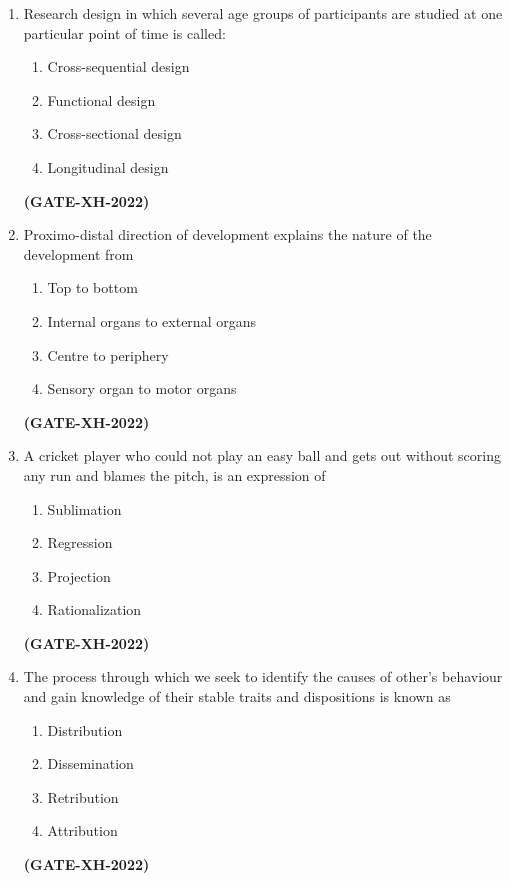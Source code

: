 \documentclass[journal]{IEEEtran}
\begin{document}
\begin{enumerate}
\item Research design in which several age groups of participants are studied at one particular point of time is called:
\begin{multicols}{2}
\begin{enumerate}
\item Cross-sequential design
\item Functional design
\item Cross-sectional design
\item Longitudinal design
\end{enumerate}
\end{multicols}
\hfill\textbf{(GATE-XH-2022)}

\item Proximo-distal direction of development explains the nature of the development from
\begin{multicols}{2}
\begin{enumerate}
\item Top to bottom
\item Internal organs to external organs
\item Centre to periphery
\item Sensory organ to motor organs
\end{enumerate}
\end{multicols}
\hfill\textbf{(GATE-XH-2022)}

\item A cricket player who could not play an easy ball and gets out without scoring any run and blames the pitch, is an expression of 
\begin{multicols}{4}
\begin{enumerate}
\item Sublimation
\item Regression
\item Projection
\item Rationalization
\end{enumerate}
\end{multicols}
\hfill\textbf{(GATE-XH-2022)}

\item The process through which we seek to identify the causes of other’s behaviour and gain knowledge of their stable traits and dispositions is known as
\begin{multicols}{4}
\begin{enumerate}
\item Distribution
\item Dissemination
\item Retribution
\item Attribution
\end{enumerate}
\end{multicols}
\hfill\textbf{(GATE-XH-2022)}


\end{enumerate}
\end{document}
